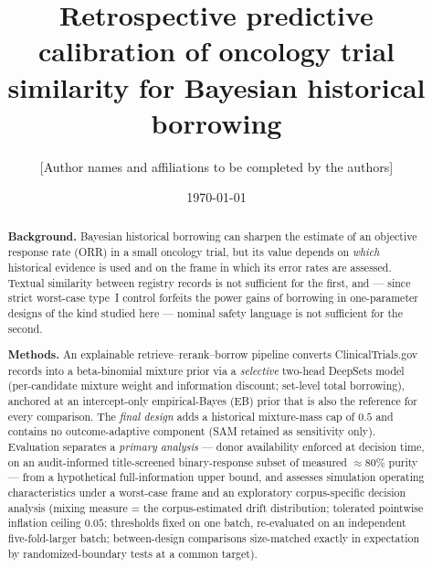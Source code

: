 \documentclass[11pt]{article}
\title{Retrospective predictive calibration of oncology trial similarity
for Bayesian historical borrowing}
\author{[Author names and affiliations to be completed by the authors]}
\date{\today}
\begin{document}
\maketitle

\begin{abstract}
\noindent\textbf{Background.} Bayesian historical borrowing can sharpen the
estimate of an objective response rate (ORR) in a small oncology trial, but
its value depends on \emph{which} historical evidence is used and on the
frame in which its error rates are assessed. Textual similarity between
registry records is not sufficient for the first, and --- since strict
worst-case type~I control forfeits the power gains of borrowing in
one-parameter designs of the kind studied here ---
nominal safety language is not sufficient for the second.

\noindent\textbf{Methods.} An explainable retrieve--rerank--borrow pipeline
converts ClinicalTrials.gov records into a beta-binomial mixture prior via
a \emph{selective} two-head DeepSets model (per-candidate mixture weight
and information discount; set-level total borrowing), anchored at an
intercept-only empirical-Bayes (EB) prior that is also the reference for
every comparison. The \emph{final design} adds a historical mixture-mass
cap of $0.5$ and contains no outcome-adaptive component (SAM retained as
sensitivity only). Evaluation separates a \emph{primary analysis} ---
donor availability enforced at decision time, on an audit-informed
title-screened binary-response subset of measured $\approx 80\%$ purity --- from a
hypothetical full-information upper bound, and assesses simulation
operating characteristics under a worst-case frame and an exploratory
corpus-specific decision analysis (mixing measure = the corpus-estimated
drift distribution; tolerated pointwise inflation ceiling $0.05$;
thresholds fixed on one batch, re-evaluated on an independent
five-fold-larger batch; between-design comparisons size-matched exactly
in expectation by randomized-boundary tests at a common target).


\end{abstract}
\end{document}
